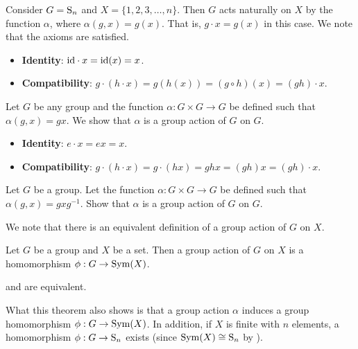 \begin{example}
    Consider $G = \mathrm{S}_{n}$ and $X = \{1, 2, 3, \dots, n\}$. Then $G$ acts naturally on $X$ by the function $\alpha$, where $\alpha(g, x) = g(x)$. That is, $g \cdot x = g(x)$ in this case. We note that the axioms are satisfied.
    \begin{itemize}
        \item \textbf{Identity}: $\mathrm{id} \cdot x = \mathrm{id}(x) = x$.
        \item \textbf{Compatibility}: $g \cdot (h \cdot x) = g(h(x)) = (g \circ h)(x) = (gh) \cdot x$.
    \end{itemize}
\end{example}

\begin{example}
    Let $G$ be any group and the function $\alpha: G\times G \to G$ be defined such that $\alpha(g, x) = gx$. We show that $\alpha$ is a group action of $G$ on $G$.
    \begin{itemize}
        \item \textbf{Identity}: $e\cdot x = ex = x$.
        \item \textbf{Compatibility}: $g \cdot (h\cdot x) = g \cdot (hx) = ghx = (gh)x = (gh) \cdot x$.
    \end{itemize}
\end{example}

\begin{exercise}\label{exercise-conjugacy-is-group-action}
    Let $G$ be a group. Let the function $\alpha: G\times G \to G$ be defined such that $\alpha(g, x) = gxg^{-1}$. Show that $\alpha$ is a group action of $G$ on $G$.
\end{exercise}

We note that there is an equivalent definition of a group action of $G$ on $X$.
\begin{definition}\label{definition-group-action-alt}
    Let $G$ be a group and $X$ be a set. Then a group action of $G$ on $X$ is a homomorphism $\phi: G\to \mathrm{Sym}(X)$.
\end{definition}
\begin{theorem}\label{thrm-group-action-definition-equivalence}
     and  are equivalent.
\end{theorem}
\begin{remark}
    What this theorem also shows is that a group action $\alpha$ induces a group homomorphism $\phi: G \to \mathrm{Sym}(X)$. In addition, if $X$ is finite with $n$ elements, a homomorphism $\phi: G \to \mathrm{S}_{n}$ exists (since $\mathrm{Sym}(X) \cong \mathrm{S}_{n}$ by ).
\end{remark}


